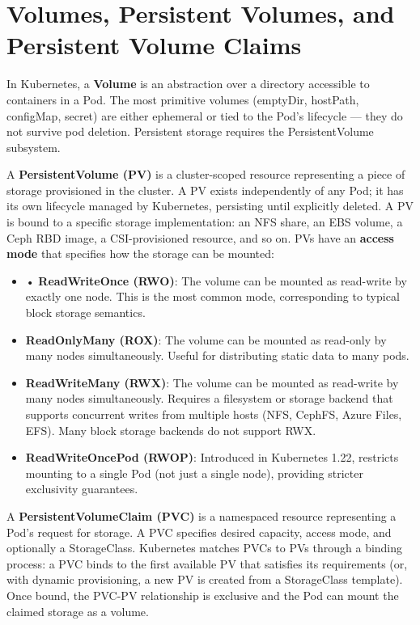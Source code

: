 \section{Volumes, Persistent Volumes, and Persistent Volume Claims}
In Kubernetes, a \textbf{Volume} is an abstraction over a directory accessible to containers in a Pod. The most primitive volumes (emptyDir, hostPath, configMap, secret) are either ephemeral or tied to the Pod's lifecycle --- they do not survive pod deletion. Persistent storage requires the PersistentVolume subsystem.

A \textbf{PersistentVolume (PV)} is a cluster-scoped resource representing a piece of storage provisioned in the cluster. A PV exists independently of any Pod; it has its own lifecycle managed by Kubernetes, persisting until explicitly deleted. A PV is bound to a specific storage implementation: an NFS share, an EBS volume, a Ceph RBD image, a CSI-provisioned resource, and so on. PVs have an \textbf{access mode} that specifies how the storage can be mounted:

\begin{itemize}
  \item • \textbf{ReadWriteOnce (RWO)}: The volume can be mounted as read-write by exactly one node. This is the most common mode, corresponding to typical block storage semantics.
  \item \textbf{ReadOnlyMany (ROX)}: The volume can be mounted as read-only by many nodes simultaneously. Useful for distributing static data to many pods.
  \item \textbf{ReadWriteMany (RWX)}: The volume can be mounted as read-write by many nodes simultaneously. Requires a filesystem or storage backend that supports concurrent writes from multiple hosts (NFS, CephFS, Azure Files, EFS). Many block storage backends do not support RWX.
  \item \textbf{ReadWriteOncePod (RWOP)}: Introduced in Kubernetes 1.22, restricts mounting to a single Pod (not just a single node), providing stricter exclusivity guarantees.
\end{itemize}

A \textbf{PersistentVolumeClaim (PVC)} is a namespaced resource representing a Pod's request for storage. A PVC specifies desired capacity, access mode, and optionally a StorageClass. Kubernetes matches PVCs to PVs through a binding process: a PVC binds to the first available PV that satisfies its requirements (or, with dynamic provisioning, a new PV is created from a StorageClass template). Once bound, the PVC-PV relationship is exclusive and the Pod can mount the claimed storage as a volume.

